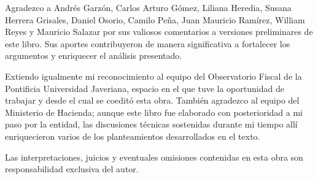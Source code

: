\documentclass[12pt]{wileySev20250618}
\begin{document}






\tableofcontents



\begin{acknowledgments}
Agradezco a Andrés Garzón, Carlos Arturo Gómez, Liliana Heredia, Susana Herrera Grisales, Daniel Osorio, Camilo Peña, Juan Mauricio Ramírez, William Reyes y Mauricio Salazar por sus valiosos comentarios a versiones preliminares de este libro. Sus aportes contribuyeron de manera significativa a fortalecer los argumentos y enriquecer el análisis presentado.

Extiendo igualmente mi reconocimiento al equipo del Observatorio Fiscal de la Pontificia Universidad Javeriana, espacio en el que tuve la oportunidad de trabajar y desde el cual se coeditó esta obra. También agradezco al equipo del Ministerio de Hacienda; aunque este libro fue elaborado con posterioridad a mi paso por la entidad, las discusiones técnicas sostenidas durante mi tiempo allí enriquecieron varios de los planteamientos desarrollados en el texto.

Las interpretaciones, juicios y eventuales omisiones contenidas en esta obra son responsabilidad exclusiva del autor.
\end{acknowledgments}
\end{document}
